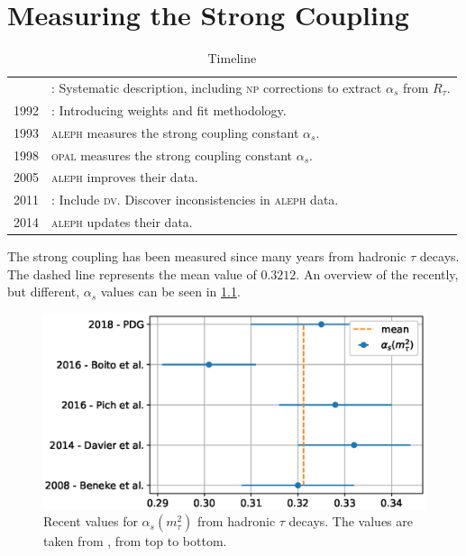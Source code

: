 \documentclass[../../index.tex]{subfiles}
\begin{document}
\chapter{Measuring the Strong Coupling}


\begin{table}
  \vspace{-1cm} \small
  \caption{Timeline}
  \begin{tabular}{@{\,}r <{\hskip 5pt} !{\foo}
      >{\raggedright\arraybackslash}p{5cm}}
    \toprule
     & \cite{Braaten1991}: Systematic description, including \textsc{np} corrections to extract \(\alpha_s\) from \(R_\tau\). \\
    1992 & \cite{LeDiberder1992}: Introducing weights and fit methodology. \\
    1993 & \cite{Aleph1993} \textsc{aleph} measures the strong coupling constant \(\alpha_s\).\\
    1998 & \cite{Opal1998} \textsc{opal} measures the strong coupling constant \(\alpha_s\).\\
    2005 & \cite{Aleph2005} \textsc{aleph} improves their data. \\
    2011 & \cite{Boito2011a,Boito2010}: Include \textsc{dv}. Discover inconsistencies in \textsc{aleph} data. \\
    2014 & \cite{Davier2013} \textsc{aleph} updates their data. \\
  \end{tabular}
  \label{table:AlphasTauTimeline}
\end{table}
The strong coupling has been measured since many years from hadronic \(\tau\)
decays. The dashed line represents the mean value of \(0.3212\). An overview of
the recently, but different, \(\alpha_s\) values can be seen in
\cref{fig:historicAlphasComparison}.
\begin{figure}
  \centering
  \includegraphics[width=\textwidth]{./images/historicAlphasComparison.eps}
  \caption{Recent values for \(\alpha_s(m_\tau^2)\) from hadronic \(\tau\)
    decays. The values are taken from \cite{PDG2018, Boito2016, Pich2016,
      Davier2013, Beneke2008}, from top to bottom.}
  \label{fig:historicAlphasComparison}
\end{figure}
\end{document}
